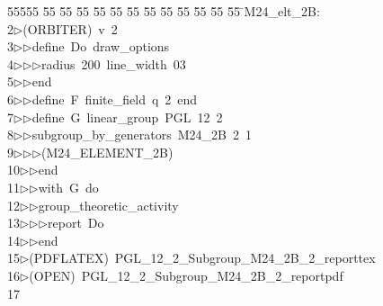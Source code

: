 %
%
\begin{tabbing}
55555 \= 55 \= 55 \= 55 \= 55 \= 55 \= 55 \= 55 \= 55 \= 55 \= 55 \= 55 \= 55 \= \>M24\_elt\_2B:\\[0pt]
2\>$\triangleright$\>(ORBITER)\ v\ 2\ \\[0pt]
3\>$\triangleright$\>$\triangleright$\>define\ Do\ draw\_options\ \\[0pt]
4\>$\triangleright$\>$\triangleright$\>$\triangleright$\>radius\ 200\ line\_width\ 03\ \\[0pt]
5\>$\triangleright$\>$\triangleright$\>end\ \\[0pt]
6\>$\triangleright$\>$\triangleright$\>define\ F\ finite\_field\ q\ 2\ end\ \\[0pt]
7\>$\triangleright$\>$\triangleright$\>define\ G\ linear\_group\ PGL\ 12\ 2\ \\[0pt]
8\>$\triangleright$\>$\triangleright$\>subgroup\_by\_generators\ M24\_2B\ 2\ 1\ \\[0pt]
9\>$\triangleright$\>$\triangleright$\>$\triangleright$\>(M24\_ELEMENT\_2B)\ \\[0pt]
10\>$\triangleright$\>$\triangleright$\>end\ \\[0pt]
11\>$\triangleright$\>$\triangleright$\>with\ G\ do\ \\[0pt]
12\>$\triangleright$\>$\triangleright$\>group\_theoretic\_activity\ \\[0pt]
13\>$\triangleright$\>$\triangleright$\>$\triangleright$\>report\ Do\ \\[0pt]
14\>$\triangleright$\>$\triangleright$\>end\\[0pt]
15\>$\triangleright$\>(PDFLATEX)\ PGL\_12\_2\_Subgroup\_M24\_2B\_2\_reporttex\\[0pt]
16\>$\triangleright$\>(OPEN)\ PGL\_12\_2\_Subgroup\_M24\_2B\_2\_reportpdf\\[0pt]
17\>\end{tabbing}
